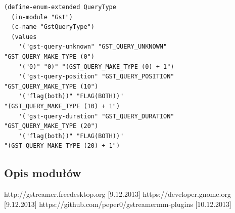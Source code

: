 \documentclass[12pt]{article}
\begin{document}
    \begin{lstlisting}[caption=Błędnie wygenerowany kod przez generator, label=badEnumForGenerator]
(define-enum-extended QueryType
  (in-module "Gst")
  (c-name "GstQueryType")
  (values
    '("gst-query-unknown" "GST_QUERY_UNKNOWN" 
"GST_QUERY_MAKE_TYPE (0")
    '("0)" "0)" "(GST_QUERY_MAKE_TYPE (0) + 1")
    '("gst-query-position" "GST_QUERY_POSITION" 
"GST_QUERY_MAKE_TYPE (10")
    '("flag(both))" "FLAG(BOTH))" 
"(GST_QUERY_MAKE_TYPE (10) + 1")
    '("gst-query-duration" "GST_QUERY_DURATION" 
"GST_QUERY_MAKE_TYPE (20")
    '("flag(both))" "FLAG(BOTH))" 
"(GST_QUERY_MAKE_TYPE (20) + 1")
    \end{lstlisting}

\subsection{Opis modułów}
\cleardoublepage
\begin{thebibliography}{9}

  http://gstreamer.freedesktop.org [9.12.2013]
  https://developer.gnome.org [9.12.2013]
  https://github.com/peper0/gstreamermm-plugins [10.12.2013]

\end{thebibliography}
\end{document}
